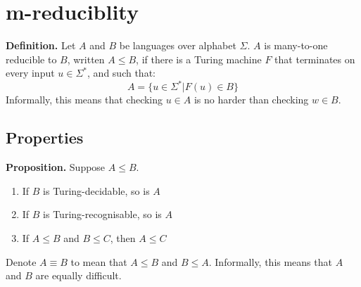 \documentclass{article}
\begin{document}
\section{m-reduciblity}
\textbf{Definition.} Let $A$ and $B$ be languages over alphabet $\Sigma$. $A$ is many-to-one reducible to $B$, written $A \leq B$, if there is a Turing machine $F$ that terminates on every input $u \in \Sigma^*$, and such that:
$$ A = \{u \in \Sigma^* | F(u) \in B\}$$
Informally, this means that checking $u \in A$ is no harder than checking $w \in B$.

\subsection{Properties}
\textbf{Proposition.} Suppose $A \leq B$.
\begin{enumerate}
	\item If $B$ is Turing-decidable, so is $A$
	\item If $B$ is Turing-recognisable, so is $A$
	\item If $A \leq B$ and $B \leq C$, then $A \leq C$
\end{enumerate}
Denote $A \equiv B$ to mean that $A \leq B$ and $B \leq A$. Informally, this means that $A$ and $B$ are equally difficult.
\end{document}
